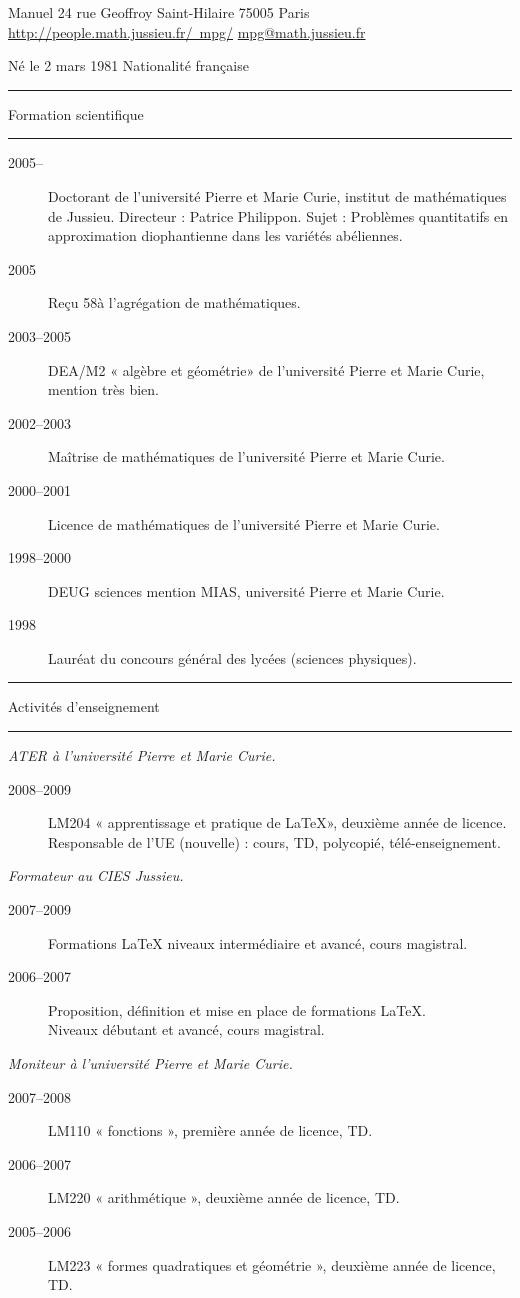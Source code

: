 \documentclass[12pt, a4paper]{article}
\newcommand\upmc{université Pierre et Marie Curie\xspace}
\newcommand\email[1]{%
  \href{mailto:#1}{#1}}
\newcommand\rmurl[1]{%
  \href{#1}{\textrm{#1}}}
\newlength\dlmargin \setlength\dlmargin{6em}
\newenvironment{dateliste}{%
  \setlength\leftmargini{\dlmargin}%
  \setlength\labelsep{0pt}%
  \renewcommand\descriptionlabel[1]{%
    \makebox[\dlmargin][l]{\sffamily##1}}%
  \begin{description}
    }{%
  \end{description}}
\newcommand*\annee[1]{%
  \item[#1]}
\newcommand*\contexte[1]{%
  \par\medskip\noindent
  \textit{#1.}}
\newcommand*\partie[1]{%
  \begin{center}
  \large\sffamily\bfseries
	\hrule
    \strut#1\\
	\hrule
  \end{center}
  \nobreak}
\begin{document}
\noindent
\begin{minipage}[t]{0.6\linewidth}\obeylines
  Manuel 
  24 rue Geoffroy Saint-Hilaire
  75005 Paris
  \rmurl{http\string://people.math.jussieu.fr/\string~mpg/}
  \email{mpg@math.jussieu.fr}
\end{minipage}%
\begin{minipage}[t]{0.4\linewidth}\raggedleft\obeylines
  Né le 2 mars 1981
  Nationalité française
\end{minipage}
\par
\vspace{1.2em}

\partie{Formation scientifique}
\begin{dateliste}
  \annee{2005--}
  Doctorant de l'université Pierre et Marie Curie, institut de
  mathématiques de Jussieu. Directeur : Patrice Philippon. Sujet :
  Problèmes quantitatifs en approximation diophantienne dans les variétés
  abéliennes.
  \annee{2005} Reçu 58\ieme à l'agrégation de mathématiques.
  \annee{2003--2005} DEA/M2 « algèbre et géométrie» de l'\upmc,\\ mention très
  bien.
  \annee{2002--2003} Maîtrise de mathématiques de l'\upmc.
  \annee{2000--2001} Licence de mathématiques de l'\upmc.
  \annee{1998--2000} DEUG sciences mention MIAS, \upmc.
  \annee{1998} Lauréat du concours général des lycées (sciences physiques).
\end{dateliste}

\partie{Activités d'enseignement}

\contexte{ATER à l'\upmc}
\begin{dateliste}
  \annee{2008--2009} LM204 « apprentissage et pratique de \LaTeX », deuxième
  année de licence.\\ Responsable de l'UE (nouvelle) : cours, TD, polycopié,
  télé-enseignement.
\end{dateliste}

\contexte{Formateur au CIES Jussieu}
\begin{dateliste}
  \annee{2007--2009} Formations \LaTeX{} niveaux intermédiaire et avancé,
  cours magistral.
  \annee{2006--2007} Proposition, définition et mise en place de formations
  \LaTeX.\\ Niveaux débutant et avancé, cours magistral.
\end{dateliste}

\contexte{Moniteur à l'\upmc}
\begin{dateliste}
  \annee{2007--2008} LM110 « fonctions », première année de licence, TD.
  \annee{2006--2007} LM220 « arithmétique », deuxième année de licence, TD.
  \annee{2005--2006} LM223 « formes quadratiques et géométrie », deuxième
  année de licence, TD.
\end{dateliste}
\end{document}
